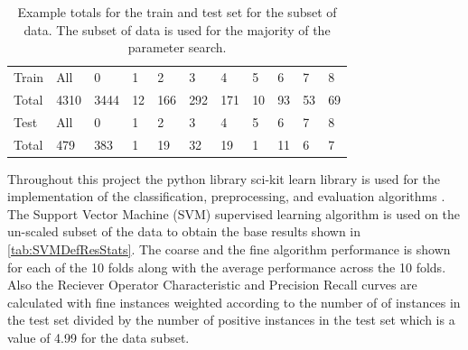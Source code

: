 \documentclass[ms]{nuthesis}
\begin{document}
\FloatBarrier
\begin{table}[H]
  \centering
  \begin{tabular}{|l||l||l||l||l||l||l||l||l||l||l|}\toprule
    Train & All & 0 & 1 & 2 & 3 & 4 & 5 & 6 & 7 & 8 \\
    Total & 4310 & 3444 & 12 & 166 & 292 & 171 & 10 & 93 & 53 & 69 \\ \midrule
    Test & All & 0 & 1 & 2 & 3 & 4 & 5 & 6 & 7 & 8 \\
    Total & 479 & 383 & 1 & 19 & 32 & 19 & 1 & 11 & 6 & 7 \\
 \bottomrule
  \end{tabular}
  \caption{Example totals for the train and test set for the subset of data. The subset of data is
  used for the majority of the parameter search.}
  \label{tab:subTrainTest}
\end{table}
\FloatBarrier


\par Throughout this project the python library sci-kit learn library is used for the implementation of the
classification, preprocessing, and evaluation algorithms \cite{scikit-learn}. The Support Vector Machine
(SVM) supervised learning algorithm is used on the un-scaled subset of the data to obtain the base
results shown in \ref{tab:SVMDefResStats}. The coarse and the fine algorithm performance is shown for each
of the 10 folds along with the average performance across the 10 folds. Also the Reciever Operator Characteristic
and Precision Recall curves are calculated with fine instances weighted according to the number of of instances in
the test set divided by the number of positive instances in the test set which is a value of 4.99 for the data subset.
\end{document}
